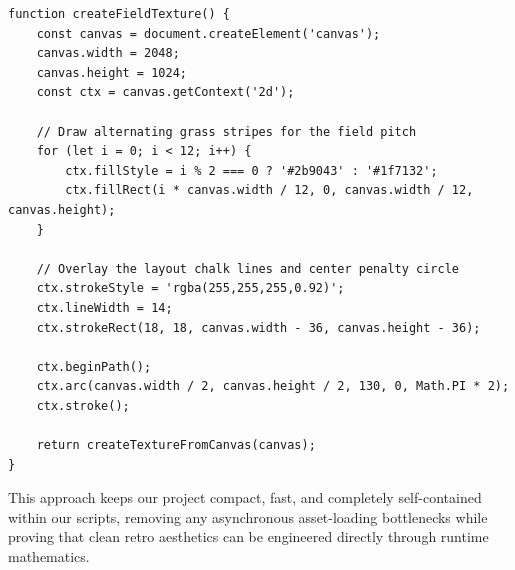 \begin{lstlisting}[style=vscode_JS]
function createFieldTexture() {
    const canvas = document.createElement('canvas');
    canvas.width = 2048;
    canvas.height = 1024;
    const ctx = canvas.getContext('2d');

    // Draw alternating grass stripes for the field pitch
    for (let i = 0; i < 12; i++) {
        ctx.fillStyle = i % 2 === 0 ? '#2b9043' : '#1f7132';
        ctx.fillRect(i * canvas.width / 12, 0, canvas.width / 12, canvas.height);
    }

    // Overlay the layout chalk lines and center penalty circle
    ctx.strokeStyle = 'rgba(255,255,255,0.92)';
    ctx.lineWidth = 14;
    ctx.strokeRect(18, 18, canvas.width - 36, canvas.height - 36);
    
    ctx.beginPath();
    ctx.arc(canvas.width / 2, canvas.height / 2, 130, 0, Math.PI * 2);
    ctx.stroke();

    return createTextureFromCanvas(canvas);
}
\end{lstlisting}

This approach keeps our project compact, fast, and completely self-contained within our scripts, removing any asynchronous asset-loading bottlenecks while proving that clean retro aesthetics can be engineered directly through runtime mathematics.